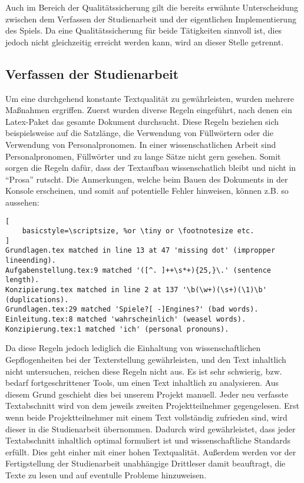 Auch im Bereich der Qualitätssicherung gilt die bereits erwähnte Unterscheidung zwischen dem Verfassen der Studienarbeit und der eigentlichen Implementierung des Spiels.
Da eine Qualitätssicherung für beide Tätigkeiten sinnvoll ist, dies jedoch nicht gleichzeitig erreicht werden kann, wird an dieser Stelle getrennt.

\subsection{Verfassen der Studienarbeit}
Um eine durchgehend konstante Textqualität zu gewährleisten, wurden mehrere Maßnahmen ergriffen. Zuerst wurden diverse Regeln eingeführt, nach denen ein Latex-Paket das gesamte Dokument durchsucht.
Diese Regeln beziehen sich beispielsweise auf die Satzlänge, die Verwendung von Füllwörtern oder die Verwendung von Personalpronomen. In einer wissenschatlichen Arbeit sind Personalpronomen, Füllwörter und zu lange Sätze nicht gern gesehen.
Somit sorgen die Regeln dafür, dass der Textaufbau wissenschatlich bleibt und nicht in \enquote{Prosa} rutscht. Die Anmerkungen, welche beim Bauen des Dokuments in der Konsole erscheinen, und somit auf potentielle Fehler hinweisen, können z.B. so aussehen:

\begin{lstlisting}[
    basicstyle=\scriptsize, %or \tiny or \footnotesize etc.
]
Grundlagen.tex matched in line 13 at 47 'missing dot' (impropper lineending).
Aufgabenstellung.tex:9 matched '([^. ]++\s*+){25,}\.' (sentence length).
Konzipierung.tex matched in line 2 at 137 '\b(\w+)(\s+)(\1)\b' (duplications).
Grundlagen.tex:29 matched 'Spiele?[ -]Engines?' (bad words).
Einleitung.tex:8 matched 'wahrscheinlich' (weasel words).
Konzipierung.tex:1 matched 'ich' (personal pronouns).
\end{lstlisting}

Da diese Regeln jedoch lediglich die Einhaltung von wissenschaftlichen Gepflogenheiten bei der Texterstellung gewährleisten, und den Text inhaltlich nicht untersuchen, reichen diese Regeln nicht aus.
Es ist sehr schwierig, bzw. bedarf fortgeschrittener Tools, um einen Text inhaltlich zu analysieren. Aus diesem Grund geschieht dies bei unserem Projekt manuell. Jeder neu verfasste Textabschnitt wird von dem jeweils zweiten Projektteilnehmer gegengelesen.
Erst wenn beide Projektteilnehmer mit einem Text vollständig zufrieden sind, wird dieser in die Studienarbeit übernommen. Dadurch wird gewährleistet, dass jeder Textabschnitt inhaltlich optimal formuliert ist und wissenschaftliche Standards erfüllt.
Dies geht einher mit einer hohen Textqualität. Außerdem werden vor der Fertigstellung der Studienarbeit unabhängige Drittleser damit beauftragt, die Texte zu lesen und auf eventulle Probleme hinzuweisen.

